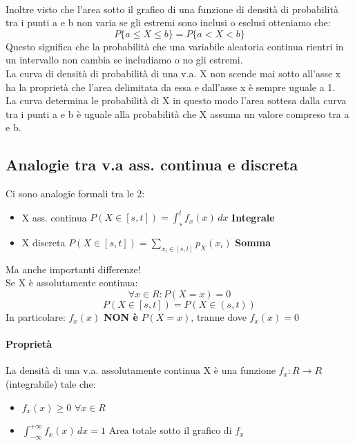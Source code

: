 \\ Inoltre visto che l'area sotto il grafico di una funzione di densità di probabilità
tra i punti a e b non varia se gli estremi sono inclusi o esclusi otteniamo che:
\begin{equation*}
    P\{a \leq X \leq b\} = P\{a < X < b \}
\end{equation*}
Questo significa che la probabilità che una variabile aleatoria continua rientri in un
intervallo non cambia se includiamo o no gli estremi.
\\ La curva di densità di probabilità di una v.a. X non scende mai sotto all'asse x ha la
proprietà che l'area delimitata da essa e dall'asse x è sempre uguale a 1.
\\ La curva determina le probabilità di X in questo modo l'area sottesa dalla curva tra i punti a
e b è uguale alla probabilità che X assuma un valore compreso tra a e b.

\subsection*{Analogie tra v.a ass. continua e discreta}
Ci sono analogie formali tra le 2: \begin{itemize}
    \item X ass. continua $P(X \in [s, t]) = \int_{s}^{t} f_x (x) \,dx$ \textbf{Integrale}
    \item X discreta $P(X \in [s, t]) = \sum_{x_i \in [s,t]}p_X (x_i)$ \textbf{Somma}
\end{itemize}
Ma anche importanti differenze!
\\ Se X è assolutamente continua:
\begin{equation*}
    \forall x \in R: P(X=x) = 0
\end{equation*}
\begin{equation*}
    P(X \in [s,t]) = P(X \in (s, t))
\end{equation*}
In particolare: $f_x (x)$ \textbf{NON è} $P(X=x)$, tranne dove $f_x (x) = 0$
\paragraph*{Proprietà} La densità di una v.a. assolutamente continua X è una funzione 
$f_x : R \to R$ (integrabile) tale che: \begin{itemize}
    \item $f_x (x) \geq 0$ $\forall x \in R$
    \item $\int_{-\infty}^{+\infty} f_x (x) \,dx = 1$ Area 
    totale sotto il grafico di $f_x$
\end{itemize}
